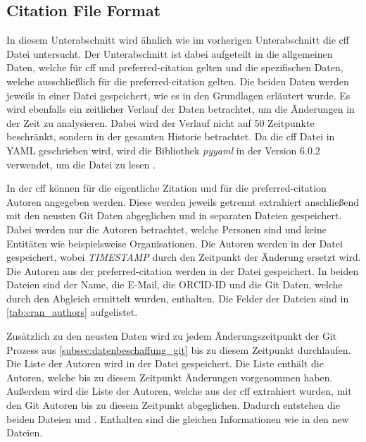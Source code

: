 \subsection{Citation File Format}
\label{subsec:datenbeschaffung_cff}
In diesem Unterabschnitt wird ähnlich wie im vorherigen Unterabschnitt die \gls{cff} Datei untersucht.
Der Unterabschnitt ist dabei aufgeteilt in die allgemeinen Daten, welche für \gls{cff} und \grqq preferred-citation\glqq{} gelten und die spezifischen Daten, welche ausschließlich für die \grqq preferred-citation\glqq{} gelten.
Die beiden Daten werden jeweils in einer  Datei gespeichert, wie es in den Grundlagen erläutert wurde.
Es wird ebenfalls ein zeitlicher Verlauf der Daten betrachtet, um die Änderungen in der Zeit zu analysieren.
Dabei wird der Verlauf nicht auf 50 Zeitpunkte beschränkt, sondern in der gesamten Historie betrachtet.
Da die \gls{cff} Datei in YAML geschrieben wird, wird die Bibliothek \emph{pyyaml} in der Version 6.0.2 verwendet, um die Datei zu lesen \autocite{noauthor_yamlpyyaml_2024}.

In der \gls{cff} können für die eigentliche Zitation und für die \grqq preferred-citation\glqq{} Autoren angegeben werden.
Diese werden jeweils getrennt extrahiert anschließend mit den neusten Git Daten abgeglichen und in separaten Dateien gespeichert.
Dabei werden nur die Autoren betrachtet, welche Personen sind und keine Entitäten wie beispielsweise Organisationen.
Die Autoren werden in der Datei  gespeichert, wobei \emph{TIMESTAMP} durch den Zeitpunkt der Änderung ersetzt wird.
Die Autoren aus der \grqq preferred-citation\glqq{} werden in der Datei  gespeichert.
In beiden Dateien sind der Name, die E-Mail, die ORCID-ID und die Git Daten, welche durch den Abgleich ermittelt wurden, enthalten.
Die Felder der Dateien sind in \autoref{tab:cran_authors} aufgelistet.

Zusätzlich zu den neusten Daten wird zu jedem Änderungszeitpunkt der Git Prozess aus \autoref{subsec:datenbeschaffung_git} bis zu diesem Zeitpunkt durchlaufen.
Die Liste der Autoren wird in der Datei  gespeichert.
Die Liste enthält die Autoren, welche bis zu diesem Zeitpunkt Änderungen vorgenommen haben.
Außerdem wird die Liste der Autoren, welche aus der \gls{cff} extrahiert wurden, mit den Git Autoren bis zu diesem Zeitpunkt abgeglichen.
Dadurch entstehen die beiden Dateien  und .
Enthalten sind die gleichen Informationen wie in den \glqq new\grqq{} Dateien.

